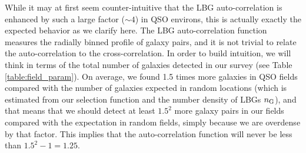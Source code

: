 \documentclass[iop, revtex4]{emulateapj}
\begin{document}
While it may at first seem counter-intuitive that the LBG
auto-correlation is enhanced by such a large factor ($\sim 4$) in QSO
environs, this is actually exactly the expected behavior as we clarify
here.  The LBG auto-correlation function measures the radially binned
profile of galaxy pairs, and it is not trivial to relate the
auto-correlation to the cross-correlation.  In order to build
intuition, we will think in terms of the total number of galaxies
detected in our survey (see Table \ref{table:field_param}). On
average, we found 1.5 times more galaxies in QSO fields compared with
the number of galaxies expected in random locations (which is
estimated from our selection function and the number density of LBGs
$n_{\rm G}$), and that means that we should detect at least $1.5^{2}$
more galaxy pairs in our fields compared with the expectation in
random fields, simply because we are overdense by that factor. This
implies that the auto-correlation function will never be less than
$1.5^{2} - 1= 1.25$.
\end{document}
